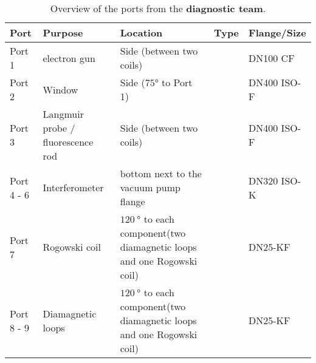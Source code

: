 \documentclass{article}
\begin{document}
\begin{table}[H]
    \centering
    \caption{Overview of the ports from the \textbf{diagnostic team}.}
    \begin{tabular}{>{\raggedright\arraybackslash}p{2cm} >{\raggedright\arraybackslash}p{3cm} >{\raggedright\arraybackslash}p{3.5cm} >{\raggedright\arraybackslash}p{3.5cm} >{\raggedright\arraybackslash}p{2cm}}
        \toprule
        \textbf{Port} & \textbf{Purpose}  & \textbf{Location}                 & \textbf{Type} & \textbf{Flange/Size}                                              \\
        \midrule
        Port 1        & electron gun   & Side (between two coils)                    &               & DN100 CF                                                                  \\
        Port 2        & Window            & Side ($75\si{\degree}$ to Port 1) &               & DN400 ISO-F                                              \\
        \midrule
        Port 3        & Langmuir probe / fluorescence rod    & Side (between two coils)                     &               & DN400 ISO-F \\
        Port 4 - 6    & Interferometer    & bottom next to the vacuum pump flange                                 &              & DN320 ISO-K                                                                 \\
        Port 7        & Rogowski coil     &$120~\si{\degree}$ to each component(two diamagnetic loops and one Rogowski coil)                                   &     & DN25-KF                                                                  \\
        Port 8 - 9    & Diamagnetic loops &$120~\si{\degree}$ to each component(two diamagnetic loops and one Rogowski coil)                                   &     &    DN25-KF                                                               \\

        \bottomrule
    \end{tabular}
\end{table}
\end{document}

